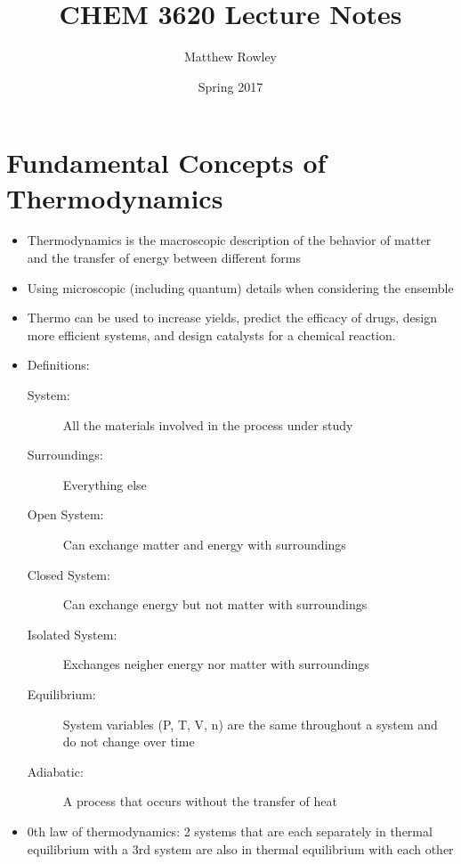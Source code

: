 \documentclass[12pt, openany, letterpaper]{memoir}
\begin{document}
\title{CHEM 3620 Lecture Notes}
\author{Matthew Rowley}
\date{Spring 2017}
\mainmatter
\maketitle
\chapter{Fundamental Concepts of Thermodynamics}
\begin{itemize}
	\item Thermodynamics is the macroscopic description of the behavior of matter and the transfer of energy between different forms
	\item Using microscopic (including quantum) details when considering the ensemble
	\item Thermo can be used to increase yields, predict the efficacy of drugs, design more efficient systems, and design catalysts for a chemical reaction.
	\item Definitions:
	\begin{description}
		\item[System:] All the materials involved in the process under study
		\item[Surroundings:] Everything else 
		\item[Open System:] Can exchange matter and energy with surroundings
		\item[Closed System:] Can exchange energy but not matter with surroundings
		\item[Isolated System:] Exchanges neigher energy nor matter with surroundings
		\item[Equilibrium:] System variables (P, T, V, n) are the same throughout a system and do not change over time
		\item[Adiabatic:] A process that occurs without the transfer of heat
	\end{description}
	\item 0th law of thermodynamics: 2 systems that are each separately in thermal equilibrium with a 3rd system are also in thermal equilibrium with each other
\end{itemize}
\end{document}
